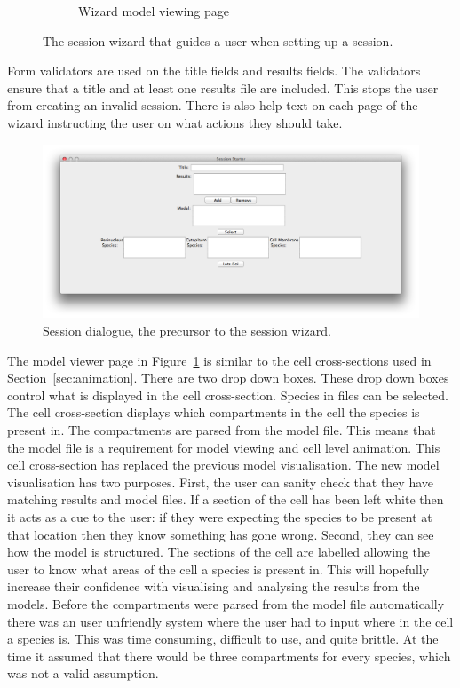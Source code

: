 \begin{figure}[h!]
\begin{subfigure}[b]{0.4\textwidth}
        \caption{Wizard model viewing page}
        \label{fig:page_4}
    \end{subfigure}
    \caption{The session wizard that guides a user when setting up a session.}
    \label{fig:session_wizard}
\end{figure}

Form validators are used on the title fields and results fields.  The validators ensure that a title and at least one results file are included.  This stops the user from creating an invalid session.  There is also help text on each page of the wizard instructing the user on what actions they should take.

\begin{figure}[h!]
    \centering
    \includegraphics[height=0.5\textwidth]{images/old_wizard.png}
    \caption{Session dialogue, the precursor to the session wizard.}
    \label{fig:old_session_dialogue}
\end{figure}

The model viewer page in Figure~\ref{fig:page_4} is similar to the cell cross-sections used in Section~\ref{sec:animation}.  There are two drop down boxes.  These drop down boxes control what is displayed in the cell cross-section.  Species in files can be selected.  The cell cross-section displays which compartments in the cell the species is present in.  The compartments are parsed from the model file.  This means that the model file is a requirement for model viewing and cell level animation.  This cell cross-section has replaced the previous model visualisation.  The new model visualisation has two purposes. First, the user can sanity check that they have matching results and model files.  If a section of the cell has been left white then it acts as a cue to the user: if they were expecting the species to be present at that location then they know something has gone wrong.  Second, they can see how the model is structured.  The sections of the cell are labelled allowing the user to know what areas of the cell a species is present in.  This will hopefully increase their confidence with visualising and analysing the results from the models. Before the compartments were parsed from the model file automatically there was an user unfriendly system where the user had to input where in the cell a species is.  This was time consuming, difficult to use, and quite brittle.  At the time it assumed that there would be three compartments for every species, which was not a valid assumption.

